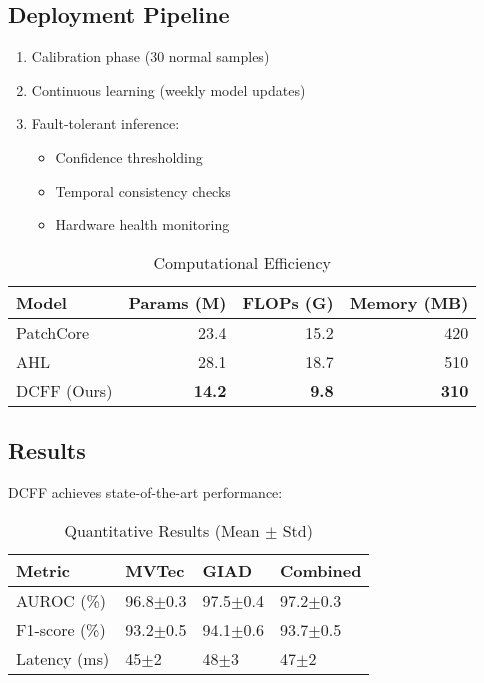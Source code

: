 \documentclass[conference]{IEEEtran}
\begin{document}
\subsection{Deployment Pipeline}
\begin{enumerate}
\item Calibration phase (30 normal samples)
\item Continuous learning (weekly model updates)
\item Fault-tolerant inference:
\begin{itemize}
\item Confidence thresholding
\item Temporal consistency checks
\item Hardware health monitoring
\end{itemize}
\end{enumerate}

\begin{table}[htbp]
\caption{Computational Efficiency}
\label{tab:efficiency}
\centering
\begin{tabularx}{0.9\columnwidth}{lrrr}
\toprule
Model & Params (M) & FLOPs (G) & Memory (MB) \\
\midrule
PatchCore & 23.4 & 15.2 & 420 \\
AHL & 28.1 & 18.7 & 510 \\
DCFF (Ours) & \textbf{14.2} & \textbf{9.8} & \textbf{310} \\
\bottomrule
\end{tabularx}
\end{table}

\subsection{Results}
DCFF achieves state-of-the-art performance:

\begin{table}[htbp]
\caption{Quantitative Results (Mean $\pm$ Std)}
\label{tab:results}
\centering
\begin{tabularx}{\columnwidth}{lXXX}
\toprule
Metric & MVTec & GIAD & Combined \\
\midrule
AUROC (\%) & 96.8$\pm$0.3 & 97.5$\pm$0.4 & 97.2$\pm$0.3 \\
F1-score (\%) & 93.2$\pm$0.5 & 94.1$\pm$0.6 & 93.7$\pm$0.5 \\
Latency (ms) & 45$\pm$2 & 48$\pm$3 & 47$\pm$2 \\
\bottomrule
\end{tabularx}
\end{table}
\end{document}
